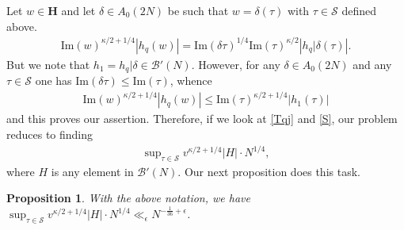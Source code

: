 \documentclass[11pt]{amsart}
\numberwithin{equation}{section}
\theoremstyle{plain}
\newtheorem{prop}[thm]{Proposition}
\theoremstyle{definition}
\newcommand{\h}{\mf H}
\newcommand{\mf}{\mathbf}
\newcommand{\mc}{\mathcal}
\newcommand{\mrm}{\mathrm}
\newcommand{\im}{\mrm{Im}}
\begin{document}
Let $w \in \h$ and let $\delta \in A_0(2N)$ be such that $w=\delta (\tau)$ with $\tau \in \mc S$ defined above. 
\begin{align}
\im(w)^{\kappa/2+1/4} \left| h_q(w) \right| = \im(\delta \tau)^{1/4} \im(\tau)^{\kappa/2} \left| h_q|\delta(\tau) \right|.
\end{align}
But we note that $h_1 = h_q|\delta \in \mc B'(N)$. However, for any $\delta \in A_0(2N)$ and any $\tau \in \mc S$ one has $\im(\delta \tau) \le \im(\tau)$, whence
\begin{align} \label{S}
    \im(w)^{\kappa/2+1/4} \left| h_q(w) \right| \le \im(\tau)^{\kappa/2+1/4} \left| h_1(\tau) \right|
\end{align}
and this proves our assertion. Therefore, if we look at \eqref{Tqj} and \eqref{S}, our problem reduces to finding
\begin{align}
    \sup \nolimits_{ \tau \in \mc S} v^{\kappa/2+1/4} \left| H \right|  \cdot N^{1/4},
\end{align}
where $H$ is any element in $\mc B'(N)$. Our next proposition does this task.
\begin{prop}
  With the above notation, we have \, $ \sup_{ \tau \in \mc S} v^{\kappa/2+1/4} \left| H \right|  \cdot N^{1/4} \ll_\epsilon N^{- \frac{1}{36} +\epsilon}$.
\end{prop}
\end{document}
